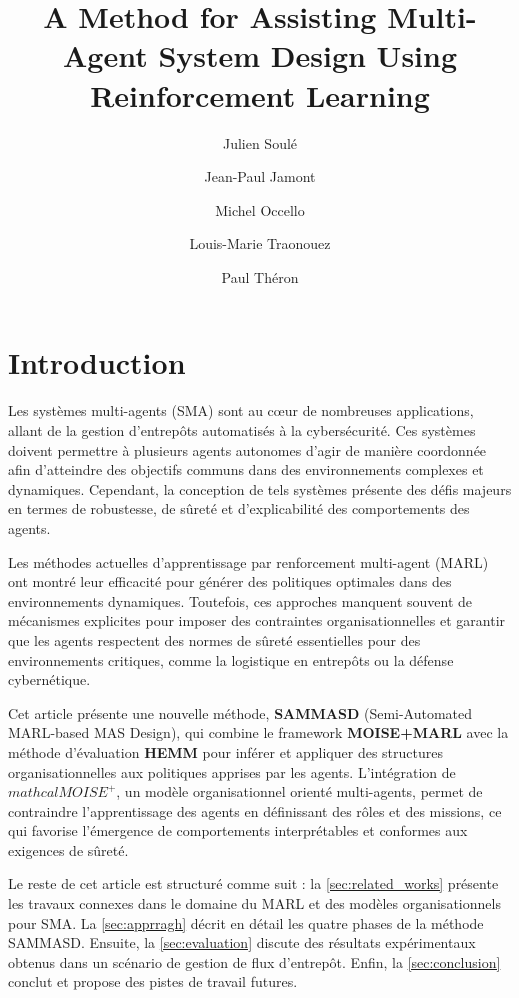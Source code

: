 \documentclass[sigconf,anonymous]{aamas}
\title[AAMAS-2025 CybMASDE]{A Method for Assisting Multi-Agent System Design Using Reinforcement Learning}
\author{Julien Soulé}
\affiliation{
  \institution{Univ. Grenoble Alpes}
  \city{Valence}
  \country{France}}
\author{Jean-Paul Jamont}
\affiliation{
  \institution{Univ. Grenoble Alpes}
  \city{Valence}
  \country{France}}
\author{Michel Occello}
\affiliation{
  \institution{Univ. Grenoble Alpes}
  \city{Valence}
  \country{France}}
\author{Louis-Marie Traonouez}
\affiliation{
  \institution{Thales Land and Air Systems, BU IAS}
  \city{Rennes}
  \country{France}}
\author{Paul Théron}
\affiliation{
  \institution{AICA IWG}
  \city{La Guillermie}
  \country{France}}
\begin{document}

\pagestyle{fancy}
\fancyhead{}


\maketitle


\section{Introduction}

Les systèmes multi-agents (SMA) sont au cœur de nombreuses applications, allant de la gestion d'entrepôts automatisés à la cybersécurité. Ces systèmes doivent permettre à plusieurs agents autonomes d'agir de manière coordonnée afin d'atteindre des objectifs communs dans des environnements complexes et dynamiques. Cependant, la conception de tels systèmes présente des défis majeurs en termes de robustesse, de sûreté et d'explicabilité des comportements des agents.

Les méthodes actuelles d'apprentissage par renforcement multi-agent (MARL) ont montré leur efficacité pour générer des politiques optimales dans des environnements dynamiques. Toutefois, ces approches manquent souvent de mécanismes explicites pour imposer des contraintes organisationnelles et garantir que les agents respectent des normes de sûreté essentielles pour des environnements critiques, comme la logistique en entrepôts ou la défense cybernétique.

Cet article présente une nouvelle méthode, \textbf{SAMMASD} (Semi-Automated MARL-based MAS Design), qui combine le framework \textbf{MOISE+MARL} avec la méthode d'évaluation \textbf{HEMM} pour inférer et appliquer des structures organisationnelles aux politiques apprises par les agents. L'intégration de \textbf{$mathcal{M}OISE^+$}, un modèle organisationnel orienté multi-agents, permet de contraindre l'apprentissage des agents en définissant des rôles et des missions, ce qui favorise l'émergence de comportements interprétables et conformes aux exigences de sûreté.

Le reste de cet article est structuré comme suit : la \autoref{sec:related_works} présente les travaux connexes dans le domaine du MARL et des modèles organisationnels pour SMA. La \autoref{sec:apprragh} décrit en détail les quatre phases de la méthode SAMMASD. Ensuite, la \autoref{sec:evaluation} discute des résultats expérimentaux obtenus dans un scénario de gestion de flux d'entrepôt. Enfin, la \autoref{sec:conclusion} conclut et propose des pistes de travail futures.
\end{document}
